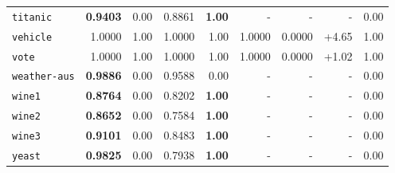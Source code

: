 \begin{tabular}{lrrrrrrrr}
\texttt{titanic} & \textbf{0.9403} & 0.00 & 0.8861 & \textbf{1.00} & - & - & - & 0.00\\
\texttt{vehicle} & 1.0000 & 1.00 & 1.0000 & 1.00 & 1.0000 & 0.0000 & +4.65 & 1.00\\
\texttt{vote} & 1.0000 & 1.00 & 1.0000 & 1.00 & 1.0000 & 0.0000 & +1.02 & 1.00\\
\texttt{weather-aus} & \textbf{0.9886} & 0.00 & 0.9588 & 0.00 & - & - & - & 0.00\\
\texttt{wine1} & \textbf{0.8764} & 0.00 & 0.8202 & \textbf{1.00} & - & - & - & 0.00\\
\texttt{wine2} & \textbf{0.8652} & 0.00 & 0.7584 & \textbf{1.00} & - & - & - & 0.00\\
\texttt{wine3} & \textbf{0.9101} & 0.00 & 0.8483 & \textbf{1.00} & - & - & - & 0.00\\
\texttt{yeast} & \textbf{0.9825} & 0.00 & 0.7938 & \textbf{1.00} & - & - & - & 0.00\\
\bottomrule
\end{tabular}
